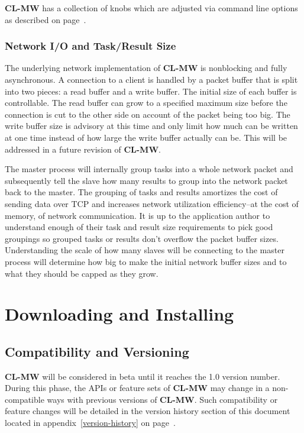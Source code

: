 \documentclass[titlepage,12pt]{book}
\newcommand{\xsmall}{\latexhtml{\small}{}}
\newcommand{\xnormalsize}{\latexhtml{\normalsize}{}}
\newcommand{\clmw}{\xsmall\textbf{CL-MW}\xnormalsize\xspace}
\begin{document}
\clmw has a collection of knobs which are adjusted via command line
options as described on page~\pageref{command-line-arguments}.

\subsection{Network I/O and Task/Result Size}

The underlying network implementation of \clmw is nonblocking and
fully asynchronous. A connection to a client is handled by a packet
buffer that is split into two pieces: a read buffer and a write
buffer. The initial size of each buffer is controllable.  The read
buffer can grow to a specified maximum size before the connection
is cut to the other side on account of the packet being too big.
The write buffer size is advisory at this time and only limit how
much can be written at one time instead of how large the write buffer
actually can be. This will be addressed in a future revision of \clmw.

The master process will internally group tasks into a whole network
packet and subsequently tell the slave how many results to group into
the network packet back to the master.  The grouping of tasks and
results amortizes the cost of sending data over TCP and increases
network utilization efficiency--at the cost of memory, of network
communication. It is up to the application author to understand
enough of their task and result size requirements to pick good
groupings so grouped tasks or results don't overflow the packet buffer
sizes. Understanding the scale of how many slaves will be connecting
to the master process will determine how big to make the initial
network buffer sizes and to what they should be capped as they grow.

\chapter{Downloading and Installing}

\section{Compatibility and Versioning}

\clmw will be considered in beta until it reaches the 1.0 version
number.  During this phase, the APIs or feature sets of \clmw
may change in a non-compatible ways with previous versions of
\clmw. Such compatibility or feature changes will be detailed
in the version history section of this document located in
appendix~\ref{version-history} on page~\pageref{version-history}.
\end{document}
